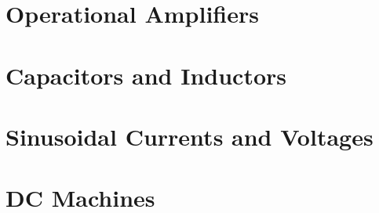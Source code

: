 \documentclass[14pt]{article}
\begin{document}
    \subsection{}
    \section{Operational Amplifiers}
    \section{Capacitors and Inductors}
    \section{Sinusoidal Currents and Voltages}
    \section{DC Machines}  
\end{document}
